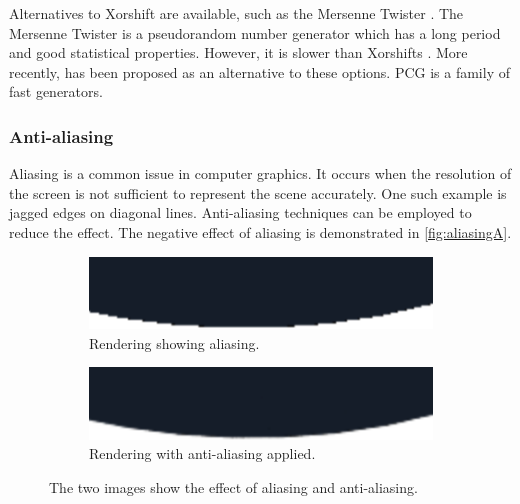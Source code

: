 Alternatives to Xorshift are available, such as the Mersenne Twister \cite{rngMersenneTwister}. The Mersenne Twister is a pseudorandom number generator which has a long period and good statistical properties. However, it is slower than Xorshifts \cite{o2014pcg}. More recently,  has been proposed as an alternative to these options. \gls{PCG} is a family of fast generators.

\subsubsection{Anti-aliasing}
\label{sec:anti-aliasing}

Aliasing is a common issue in computer graphics. It occurs when the resolution of the screen is not sufficient to represent the scene accurately. One such example is jagged edges on diagonal lines. Anti-aliasing techniques can be employed to reduce the effect. The negative effect of aliasing is demonstrated in \autoref{fig:aliasingA}.

\begin{figure}[H]
    \centering
    \begin{subfigure}[b]{0.45\textwidth}
        \includegraphics[width=\textwidth]{resources/aliasing.png}
        \caption{Rendering showing aliasing.}
        \label{fig:aliasingA}
    \end{subfigure}
    \hfill
    \begin{subfigure}[b]{0.45\textwidth}
        \includegraphics[width=\textwidth]{resources/anti-aliasing.png}
        \caption{Rendering with anti-aliasing applied.}
        \label{fig:aliasingB}
    \end{subfigure}
    \caption{The two images show the effect of aliasing and anti-aliasing.}
    \label{fig:aliasing}
\end{figure}

